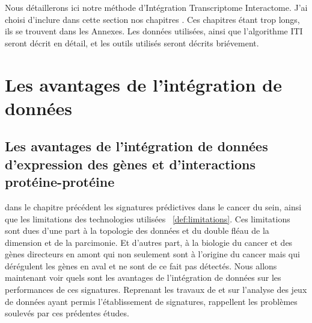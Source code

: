 \singlespacing

		\begin{center}
			\begin{tcolorbox}[colback=green!5!white,colframe=green!45!black,arc=0mm]
				\sffamily
				Nous détaillerons ici notre méthode d'Intégration Transcriptome Interactome. J'ai choisi d'inclure dans cette section nos chapitres \citep{Garcia2011,Garcia2013}. Ces chapitres étant trop longs, ils se trouvent dans les Annexes. Les données utilisées, ainsi que l'algorithme ITI seront décrit en détail, et les outils utilisés seront décrits briévement.
			\end{tcolorbox}
			\vspace{5ex}
			\minitoc
		\end{center}
		\newpage

\doublespacing

	\section{\textcolor{green!45!black}{Les avantages de l'intégration de données}}

		\subsection{\textcolor{green!45!black}{Les avantages de l'intégration de données d'expression des gènes et d'interactions protéine-protéine}}
			 dans le chapitre précédent les signatures prédictives dans le cancer du sein, ainsi que les limitations des technologies utilisées ~\ref{def:limitations}.
			Ces limitations sont dues d'une part à la topologie des données et du double fléau de la dimension et de la parcimonie.
			Et d'autres part, à la biologie du cancer et des gènes directeurs en amont qui non seulement sont à l'origine du cancer mais qui dérégulent les gènes en aval et ne sont de ce fait pas détectés.
			Nous allons maintenant voir quels sont les avantages de l'intégration de données sur les performances de ces signatures.
			Reprenant les travaux de \citeauthor{vandevijver2002} et \citeauthor{Wang2005} sur l'analyse des jeux de données ayant permis l'établissement de signatures, \citeauthor{Chuang2007} rappellent les problèmes soulevés par ces prédentes études.

